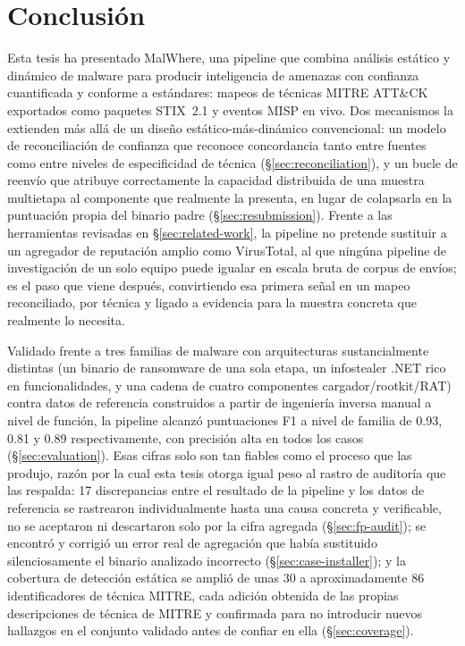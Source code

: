 \section{Conclusi\'on}
\label{sec:conclusion}

Esta tesis ha presentado MalWhere, una pipeline que combina
an\'alisis est\'atico y din\'amico de malware para producir
inteligencia de amenazas con confianza cuantificada y conforme a
est\'andares: mapeos de t\'ecnicas MITRE ATT\&CK exportados como
paquetes STIX~2.1 y eventos MISP en vivo. Dos mecanismos la extienden
m\'as all\'a de un dise\~no est\'atico-m\'as-din\'amico convencional: un
modelo de reconciliaci\'on de confianza que reconoce concordancia tanto
entre fuentes como entre niveles de especificidad de t\'ecnica
(\S\ref{sec:reconciliation}), y un bucle de reenv\'io que atribuye
correctamente la capacidad distribuida de una muestra multietapa al
componente que realmente la presenta, en lugar de colapsarla en la
puntuaci\'on propia del binario padre (\S\ref{sec:resubmission}).
Frente a las herramientas revisadas en \S\ref{sec:related-work}, la
pipeline no pretende sustituir a un agregador de reputaci\'on amplio
como VirusTotal, al que ning\'una pipeline de investigaci\'on de un solo
equipo puede igualar en escala bruta de corpus de env\'ios; es el paso
que viene despu\'es, convirtiendo esa primera se\~nal en un mapeo
reconciliado, por t\'ecnica y ligado a evidencia para la muestra
concreta que realmente lo necesita.

Validado frente a tres familias de malware con arquitecturas
sustancialmente distintas (un binario de ransomware de una sola etapa,
un infostealer .NET rico en funcionalidades, y una cadena de cuatro
componentes cargador/rootkit/RAT) contra datos de referencia
construidos a partir de ingenier\'ia inversa manual a nivel de
funci\'on, la pipeline alcanz\'o puntuaciones F1 a nivel de familia de
0.93, 0.81 y 0.89 respectivamente, con precisi\'on alta
en todos los casos (\S\ref{sec:evaluation}). Esas cifras solo son tan
fiables como el proceso que las produjo, raz\'on por la cual esta tesis
otorga igual peso al rastro de auditor\'ia que las respalda: 17
discrepancias entre el resultado de la pipeline y los datos de
referencia se rastrearon individualmente hasta una causa concreta y
verificable, no se aceptaron ni descartaron solo por la cifra agregada
(\S\ref{sec:fp-audit}); se encontr\'o y corrigi\'o un error real de
agregaci\'on que hab\'ia sustituido silenciosamente el binario analizado
incorrecto (\S\ref{sec:case-installer}); y la cobertura de detecci\'on
est\'atica se ampli\'o de unas 30 a aproximadamente 86 identificadores
de t\'ecnica MITRE, cada adici\'on obtenida de las propias
descripciones de t\'ecnica de MITRE y confirmada para no introducir
nuevos hallazgos en el conjunto validado antes de confiar en ella
(\S\ref{sec:coverage}).

